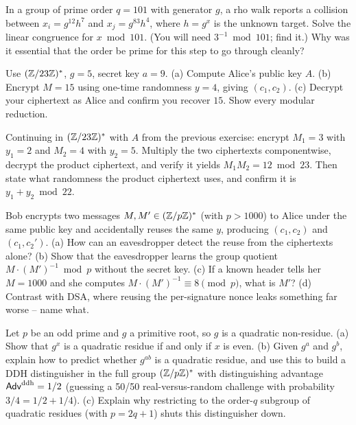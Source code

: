 \begin{exercise}
\label{ch20:exc-rho}
In a group of prime order $q = 101$ with generator $g$, a rho walk reports a collision between
$x_i = g^{12} h^{7}$ and $x_j = g^{83} h^{4}$, where $h = g^{x}$ is the unknown target. Solve the
linear congruence for $x \bmod 101$. (You will need $3^{-1} \bmod 101$; find it.) Why was it
essential that the order be prime for this step to go through cleanly?
\end{exercise}

\begin{exercise}
\label{ch20:exc-elgamal}
Use $(\mathbb{Z}/23\mathbb{Z})^{*}$, $g = 5$, secret key $a = 9$. (a) Compute Alice's public key $A$. (b) Encrypt
$M = 15$ using one-time randomness $y = 4$, giving $(c_1, c_2)$. (c) Decrypt your ciphertext as Alice
and confirm you recover $15$. Show every modular reduction.
\end{exercise}

\begin{exercise}
\label{ch20:exc-homo}
Continuing in $(\mathbb{Z}/23\mathbb{Z})^{*}$ with $A$ from the previous exercise: encrypt $M_1 = 3$ with $y_1 = 2$ and
$M_2 = 4$ with $y_2 = 5$. Multiply the two ciphertexts componentwise, decrypt the product ciphertext,
and verify it yields $M_1 M_2 = 12 \bmod 23$. Then state what randomness the product ciphertext
uses, and confirm it is $y_1 + y_2 \bmod 22$.
\end{exercise}

\begin{exercise}
\label{ch20:exc-nonce}
Bob encrypts two messages $M, M' \in (\mathbb{Z}/p\mathbb{Z})^{*}$ (with $p > 1000$) to Alice under the same public key and accidentally reuses the same $y$,
producing $(c_1, c_2)$ and $(c_1, c_2')$. (a) How can an eavesdropper detect the reuse from the
ciphertexts alone? (b) Show that the eavesdropper learns the group quotient $M \cdot (M')^{-1} \bmod p$ without the secret key. (c) If a
known header tells her $M = 1000$ and she computes $M \cdot (M')^{-1} \equiv 8 \pmod p$, what is $M'$? (d) Contrast with DSA,
where reusing the per-signature nonce leaks something far worse -- name what.
\end{exercise}

\begin{exercise}
\label{ch20:exc-legendre}
Let $p$ be an odd prime and $g$ a primitive root, so $g$ is a quadratic non-residue. (a) Show that
$g^{x}$ is a quadratic residue if and only if $x$ is even. (b) Given $g^a$ and $g^b$, explain how to
predict whether $g^{ab}$ is a quadratic residue, and use this to build a DDH distinguisher in
the full group $(\mathbb{Z}/p\mathbb{Z})^{*}$ with distinguishing advantage $\mathsf{Adv}^{\mathrm{ddh}} = 1/2$ (guessing a 50/50 real-versus-random challenge with probability $3/4 = 1/2 + 1/4$). (c) Explain why restricting to the order-$q$ subgroup of quadratic residues
(with $p = 2q+1$) shuts this distinguisher down.
\end{exercise}

